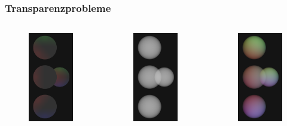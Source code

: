 \documentclass[xcolor=dvipsnames]{beamer}
\begin{document}
\begin{frame}
	\frametitle{Transparenzprobleme}
	
	\begin{columns}
		\begin{column}{3cm}
			\begin{figure}
				\includegraphics[width=3.5cm]{images/phong_global.png}
			\end{figure}
		\end{column}
		\begin{column}{3cm}
			\begin{figure}
				\includegraphics[width=3.5cm]{images/em_easy.png}
			\end{figure}
		\end{column}
		\begin{column}{3cm}
			\begin{figure}
				\includegraphics[width=3.5cm]{images/em_global.png}
			\end{figure}
		\end{column}
	\end{columns}
\end{frame}
\end{document}
